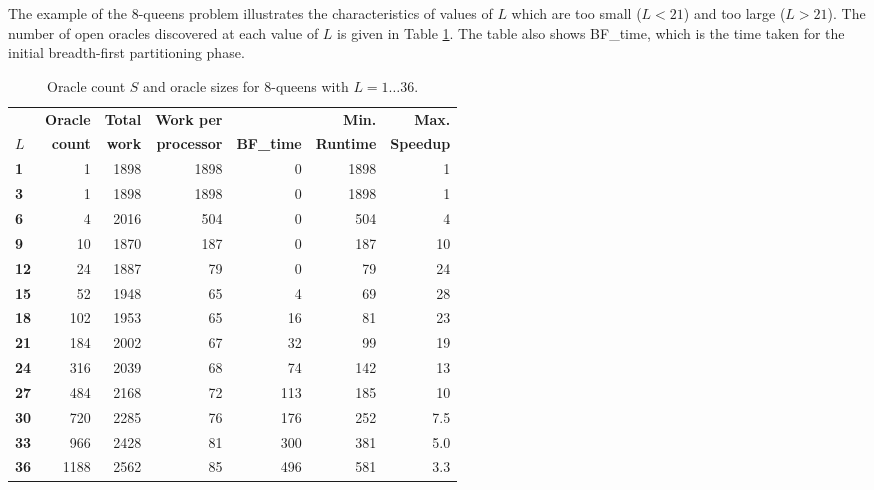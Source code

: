 The example of the 8-queens problem illustrates the characteristics of values of $L$ which
are too small ($L<21$) and too large ($L>21$).  The number of open oracles discovered at
each value of $L$ is given in Table \ref{q8_orc_counts}.  The table also shows BF\_{}time,
which is the time taken for the initial breadth-first partitioning phase.

\begin{table}[htbp]
{\small
\begin{tabular}{| l | r | r | r | r | r | r |}
\hline
             & \textbf{Oracle} & \textbf{Total} & \textbf{Work per}  &                     & \textbf{Min.}    & \textbf{Max.}    \\
\textbf{$L$} & \textbf{count}  & \textbf{work}  & \textbf{processor} & \textbf{BF\_{}time} & \textbf{Runtime} & \textbf{Speedup} \\
\hline
\textbf{1}   &    1            & 1898           & 1898               &  0                  & 1898             & 1 \\
\textbf{3}   &    1            & 1898           & 1898               &  0                  & 1898             & 1 \\
\textbf{6}   &    4            & 2016           &  504               &  0                  &  504             & 4 \\
\textbf{9}   &   10            & 1870           &  187               &  0                  &  187             & 10 \\
\textbf{12}  &   24            & 1887           &   79               &  0                  &   79             & 24 \\
\textbf{15}  &   52            & 1948           &   65               &  4                  &   69             & 28 \\
\textbf{18}  &  102            & 1953           &   65               &  16                 &   81             & 23 \\
\textbf{21}  &  184            & 2002           &   67               &  32                 &   99             & 19 \\
\textbf{24}  &  316            & 2039           &   68               &  74                 &  142             & 13 \\
\textbf{27}  &  484            & 2168           &   72               & 113                 &  185              & 10 \\
\textbf{30}  &  720            & 2285           &   76               & 176                 &  252             & 7.5 \\
\textbf{33}  &  966            & 2428           &   81               & 300                 &  381             & 5.0 \\
\textbf{36}  & 1188            & 2562           &   85               & 496                 &  581             & 3.3 \\
\hline
\end{tabular}
}
\caption{Oracle count $S$ and oracle sizes for 8-queens with $L=1\ldots 36$.}
\label{q8_orc_counts}
\end{table}


